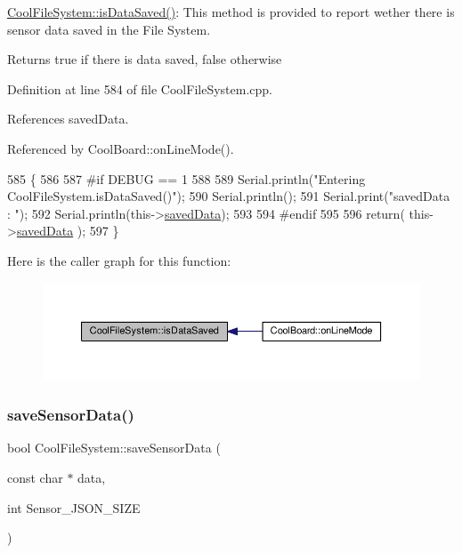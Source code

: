 \hyperlink{classCoolFileSystem_a5a7eaeea7a9fbf8aaef651d862fa3b5b}{Cool\+File\+System\+::is\+Data\+Saved()}\+: This method is provided to report wether there is sensor data saved in the File System.

\begin{DoxyReturn}{Returns}
true if there is data saved, false otherwise 
\end{DoxyReturn}


Definition at line 584 of file Cool\+File\+System.\+cpp.



References saved\+Data.



Referenced by Cool\+Board\+::on\+Line\+Mode().


\begin{DoxyCode}
585 \{
586 
587 \textcolor{preprocessor}{#if DEBUG == 1 }
588 
589     Serial.println(\textcolor{stringliteral}{"Entering CoolFileSystem.isDataSaved()"});
590     Serial.println();
591     Serial.print(\textcolor{stringliteral}{"savedData : "});
592     Serial.println(this->\hyperlink{classCoolFileSystem_ad398e0c5c41a0c88acdf5d672aa71351}{savedData});
593 
594 \textcolor{preprocessor}{#endif}
595 
596     \textcolor{keywordflow}{return}( this->\hyperlink{classCoolFileSystem_ad398e0c5c41a0c88acdf5d672aa71351}{savedData} );
597 \}
\end{DoxyCode}
Here is the caller graph for this function\+:\nopagebreak
\begin{figure}[H]
\begin{center}
\leavevmode
\includegraphics[width=350pt]{classCoolFileSystem_a5a7eaeea7a9fbf8aaef651d862fa3b5b_icgraph}
\end{center}
\end{figure}
\mbox{\label{classCoolFileSystem_a4c560c2ddd40b74b7758e6ceb2c58957}} 
\subsubsection{\texorpdfstring{save\+Sensor\+Data()}{saveSensorData()}}
{\footnotesize\ttfamily bool Cool\+File\+System\+::save\+Sensor\+Data (\begin{DoxyParamCaption}\item[{const char $\ast$}]{data,  }\item[{int}]{Sensor\+\_\+\+J\+S\+O\+N\+\_\+\+S\+I\+ZE }\end{DoxyParamCaption})}

